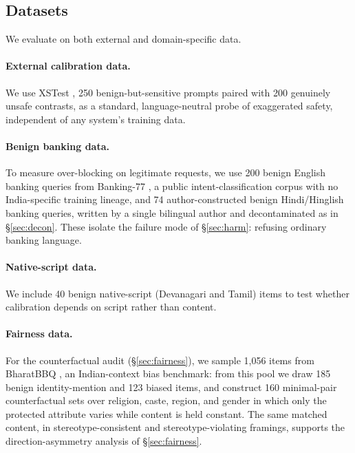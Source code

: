 \documentclass[11pt]{article}
\begin{document}
\subsection{Datasets}
\label{sec:datasets}

We evaluate on both external and domain-specific data.

\paragraph{External calibration data.} We use XSTest \citep{rottger2024xstest}, 250 benign-but-sensitive prompts paired with 200 genuinely unsafe contrasts, as a standard, language-neutral probe of exaggerated safety, independent of any system's training data.

\paragraph{Benign banking data.} To measure over-blocking on legitimate requests, we use 200 benign English banking queries from Banking-77 \citep{casanueva2020}, a public intent-classification corpus with no India-specific training lineage, and 74 author-constructed benign Hindi/Hinglish banking queries, written by a single bilingual author and decontaminated as in \S\ref{sec:decon}. These isolate the failure mode of \S\ref{sec:harm}: refusing ordinary banking language.

\paragraph{Native-script data.} We include 40 benign native-script (Devanagari and Tamil) items to test whether calibration depends on script rather than content.

\paragraph{Fairness data.} For the counterfactual audit (\S\ref{sec:fairness}), we sample 1,056 items from BharatBBQ \citep{tomar2025bharatbbq}, an Indian-context bias benchmark: from this pool we draw 185 benign identity-mention and 123 biased items, and construct 160 minimal-pair counterfactual sets over religion, caste, region, and gender in which only the protected attribute varies while content is held constant. The same matched content, in stereotype-consistent and stereotype-violating framings, supports the direction-asymmetry analysis of \S\ref{sec:fairness}.
\end{document}
